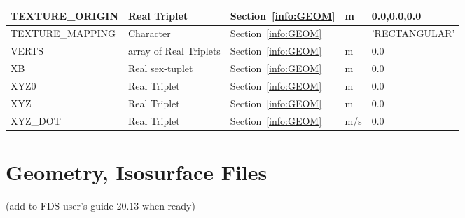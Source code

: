 \documentclass[12pt]{article}
\begin{document}
\begin{longtable}{@{\extracolsep{\fill}}|l|l|l|l|l|}
{\ct TEXTURE\_ORIGIN} & Real Triplet        & Section~\ref{info:GEOM}            &   m       &   0.0,0.0,0.0            \\ \hline
{\ct TEXTURE\_MAPPING}& Character           & Section~\ref{info:GEOM}            &           & {\ct 'RECTANGULAR'}      \\ \hline
{\ct VERTS}        & array of Real Triplets & Section~\ref{info:GEOM}            &   m       &   0.0                    \\ \hline
{\ct XB}           & Real sex-tuplet        & Section~\ref{info:GEOM}            &   m       &   0.0                    \\ \hline
{\ct XYZ0}         & Real Triplet           & Section~\ref{info:GEOM}            &   m       &   0.0                    \\ \hline
{\ct XYZ}          & Real Triplet           & Section~\ref{info:GEOM}            &   m       &   0.0                    \\ \hline
{\ct XYZ\_DOT}     & Real Triplet           & Section~\ref{info:GEOM}            &   m/s     &   0.0                    \\ \hline

\end{longtable}


\vspace{\baselineskip}

\section{Geometry, Isosurface Files}
\label{out:GEOMETRY}

(add to FDS user's guide 20.13 when ready)
\end{document}
